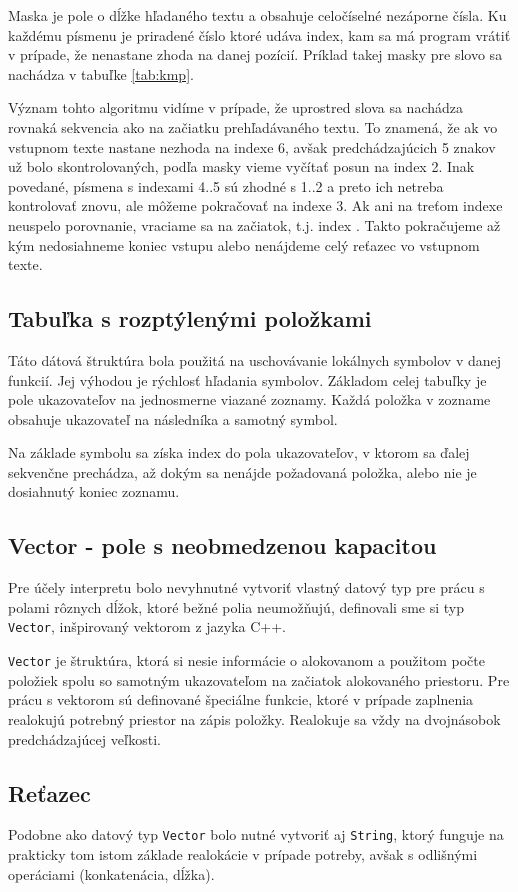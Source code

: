 \documentclass[12pt,a4paper,titlepage,final]{article}
\begin{document}
Maska je pole o dĺžke hľadaného textu a obsahuje celočíselné nezáporne čísla.
Ku každému písmenu je priradené číslo ktoré udáva index, kam sa má program
 vrátiť v prípade, že nenastane zhoda na danej pozícií. Príklad takej masky
 pre slovo  sa nachádza v tabuľke \ref{tab:kmp}.

Význam tohto algoritmu vidíme v prípade, že uprostred slova sa nachádza
 rovnaká sekvencia ako na začiatku prehľadávaného textu.
To znamená, že ak vo vstupnom texte nastane nezhoda na indexe 6, avšak
 predchádzajúcich 5 znakov už bolo skontrolovaných, podľa masky vieme vyčítať
 posun na index 2. Inak povedané, písmena s indexami 4..5 sú zhodné s 1..2
 a preto ich netreba kontrolovať znovu, ale môžeme pokračovať na indexe 3.
Ak ani na treťom indexe neuspelo porovnanie, vraciame sa na začiatok, t.j.
index . Takto pokračujeme až kým nedosiahneme koniec vstupu alebo
nenájdeme celý reťazec vo vstupnom texte.

\subsection{Tabuľka s rozptýlenými položkami}
Táto dátová štruktúra bola použitá na uschovávanie lokálnych symbolov v danej
 funkcií. Jej výhodou je rýchlosť hľadania symbolov. 
Základom celej tabuľky je pole ukazovateľov na jednosmerne viazané zoznamy.
Každá položka v zozname obsahuje ukazovateľ na následníka a samotný symbol.

Na základe symbolu sa získa index do pola ukazovateľov, v ktorom sa ďalej
 sekvenčne prechádza, až dokým sa nenájde požadovaná položka, alebo nie je
 dosiahnutý koniec zoznamu.
 
\subsection{Vector - pole s neobmedzenou kapacitou}
Pre účely interpretu bolo nevyhnutné vytvoriť vlastný datový typ pre prácu
s polami rôznych dĺžok, ktoré bežné polia neumožňujú, definovali sme si
typ \texttt{Vector}, inšpirovaný vektorom z jazyka C++. 

\texttt{Vector} je štruktúra, ktorá si nesie informácie o alokovanom a použitom 
počte položiek spolu so samotným ukazovateľom na začiatok alokovaného priestoru. 
Pre prácu s vektorom sú definované špeciálne funkcie, ktoré v prípade zaplnenia
realokujú potrebný priestor na zápis položky. Realokuje sa vždy na dvojnásobok
predchádzajúcej veľkosti.


\subsection{Reťazec}
Podobne ako datový typ \texttt{Vector} bolo nutné vytvoriť aj \texttt{String},
ktorý funguje na prakticky tom istom základe realokácie v prípade potreby,
avšak s odlišnými operáciami (konkatenácia, dĺžka).
\end{document}

